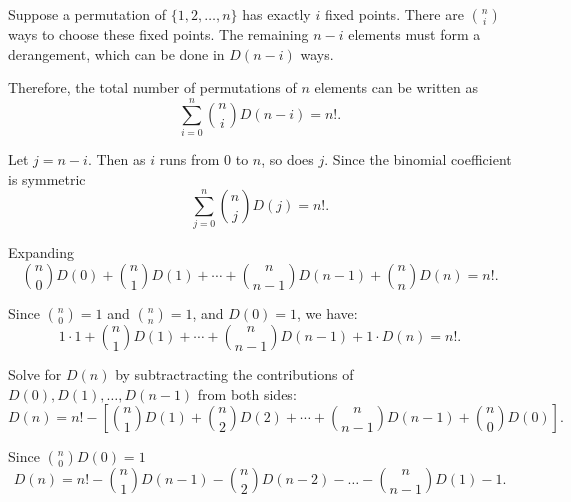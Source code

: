 \documentclass{report}
\begin{document}
\begin{proofWithHibiscus}
  Suppose a permutation of \(\{1,2,\dots,n\}\) has exactly \(i\) fixed points. 
  There are \(\binom{n}{i}\) ways to choose these fixed points. 
  The remaining \(n-i\) elements must form a derangement, which can be done in \(D(n-i)\) ways.

  \medskip 

  Therefore, the total number of permutations of \(n\) elements can be written as
  \[
  \sum_{i=0}^{n} \binom{n}{i} D(n-i) = n!.
  \]
  
  \bigskip

  Let \(j=n-i\). Then as \(i\) runs from 0 to \(n\), so does \(j\). Since the binomial coefficient is symmetric
  \[
  \sum_{j=0}^{n} \binom{n}{j} D(j) = n!.
  \]
  
  Expanding
  \[
  \binom{n}{0}D(0)+\binom{n}{1}D(1)+\cdots+\binom{n}{n-1}D(n-1)+\binom{n}{n}D(n) = n!.
  \]
  
  Since \(\binom{n}{0} = 1\) and \(\binom{n}{n} = 1\), and \(D(0)=1\), we have:
  \[
  1 \cdot 1 + \binom{n}{1}D(1)+\cdots+\binom{n}{n-1}D(n-1) + 1 \cdot D(n) = n!.
  \]
  
  \bigskip
  
  Solve for \(D(n)\) by subtractracting the contributions of \(D(0), D(1), \dots, D(n-1)\) from both sides:
  \[
  D(n) = n! - \left[\binom{n}{1}D(1)+\binom{n}{2}D(2)+\cdots+\binom{n}{n-1}D(n-1)+ \binom{n}{0}D(0)\right].
  \]
  
  Since \(\binom{n}{0}D(0)=1\)
  \[
  D(n) = n! - \binom{n}{1}D(n-1) - \binom{n}{2}D(n-2) - \dots - \binom{n}{n-1}D(1) - 1.
  \]
  
  
\end{proofWithHibiscus}
\end{document}
